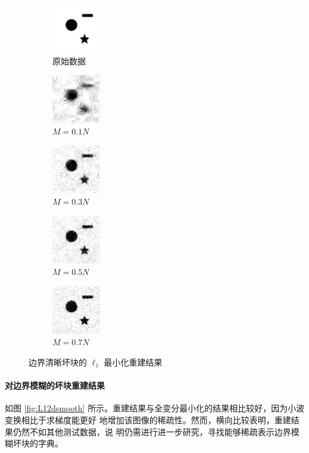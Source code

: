 \begin{figure}
\centering
\begin{subfigure}[t]{1.1in}
	\includegraphics{Figure/testdata/2dsharp.png}
	\caption{原始数据}
\end{subfigure}
\begin{subfigure}[t]{1.1in}
	\includegraphics{Figure/L1/2dsharp10.png}
	\caption{$M = 0.1 N$}
\end{subfigure}
\begin{subfigure}[t]{1.1in}
	\includegraphics{Figure/L1/2dsharp30.png}
	\caption{$M = 0.3 N$}
\end{subfigure}
\begin{subfigure}[t]{1.1in}
	\includegraphics{Figure/L1/2dsharp50.png}
	\caption{$M = 0.5 N$}
\end{subfigure}
\begin{subfigure}[t]{1.1in}
	\includegraphics{Figure/L1/2dsharp70.png}
	\caption{$M = 0.7 N$}
\end{subfigure}
\caption{边界清晰坏块的 $\ell_1$ 最小化重建结果}
\label{fig:L12dsharp}
\end{figure}

\paragraph{对边界模糊的坏块重建结果} 如图 \ref{fig:L12dsmooth}
所示。重建结果与全变分最小化的结果相比较好，因为小波变换相比于求梯度能更好
地增加该图像的稀疏性。然而，横向比较表明，重建结果仍然不如其他测试数据，说
明仍需进行进一步研究，寻找能够稀疏表示边界模糊坏块的字典。

